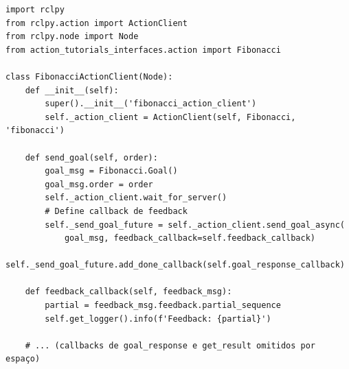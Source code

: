 \documentclass[preview,border=2pt]{standalone}
\begin{document}
\begin{lstlisting}[style=pythonstyle]
import rclpy
from rclpy.action import ActionClient
from rclpy.node import Node
from action_tutorials_interfaces.action import Fibonacci

class FibonacciActionClient(Node):
    def __init__(self):
        super().__init__('fibonacci_action_client')
        self._action_client = ActionClient(self, Fibonacci, 'fibonacci')

    def send_goal(self, order):
        goal_msg = Fibonacci.Goal()
        goal_msg.order = order
        self._action_client.wait_for_server()
        # Define callback de feedback
        self._send_goal_future = self._action_client.send_goal_async(
            goal_msg, feedback_callback=self.feedback_callback)
        self._send_goal_future.add_done_callback(self.goal_response_callback)

    def feedback_callback(self, feedback_msg):
        partial = feedback_msg.feedback.partial_sequence
        self.get_logger().info(f'Feedback: {partial}')
    
    # ... (callbacks de goal_response e get_result omitidos por espaço)
\end{lstlisting}
\end{document}
